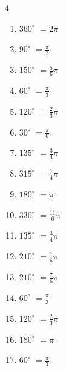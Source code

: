 \begin{multicols}{4}
\begin{enumerate}
  \item $\displaystyle 360^{\circ}$
        $\displaystyle =2\pi$

  \item $\displaystyle 90^{\circ}$
        $\displaystyle =\frac{\pi}{2}$

  \item $\displaystyle 150^{\circ}$
        $\displaystyle =\frac{5}{6}\pi$

  \item $\displaystyle 60^{\circ}$
        $\displaystyle =\frac{\pi}{3}$

  \item $\displaystyle 120^{\circ}$
        $\displaystyle =\frac{2}{3}\pi$

  \item $\displaystyle 30^{\circ}$
        $\displaystyle =\frac{\pi}{6}$

  \item $\displaystyle 135^{\circ}$
        $\displaystyle =\frac{3}{4}\pi$

  \item $\displaystyle 315^{\circ}$
        $\displaystyle =\frac{7}{4}\pi$

  \item $\displaystyle 180^{\circ}$
        $\displaystyle =\pi$

\columnbreak %

  \item $\displaystyle 330^{\circ}$
        $\displaystyle =\frac{11}{6}\pi$

  \item $\displaystyle 135^{\circ}$
        $\displaystyle =\frac{3}{4}\pi$

  \item $\displaystyle 210^{\circ}$
        $\displaystyle =\frac{7}{6}\pi$

  \item $\displaystyle 210^{\circ}$
        $\displaystyle =\frac{7}{6}\pi$

  \item $\displaystyle 60^{\circ}$
        $\displaystyle =\frac{\pi}{3}$

  \item $\displaystyle 120^{\circ}$
        $\displaystyle =\frac{2}{3}\pi$

  \item $\displaystyle 180^{\circ}$
        $\displaystyle =\pi$

  \item $\displaystyle 60^{\circ}$
        $\displaystyle =\frac{\pi}{3}$


\end{enumerate}
\end{multicols}
